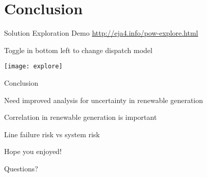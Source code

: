 





\section{Conclusion}
\begin{frame}{Solution Exploration Demo}
\url{http://eja4.info/pow-explore.html}
\bi
\item Toggle in bottom left to change dispatch model
\ei
\begin{center}
\texttt{[image: explore]}
\end{center}
\end{frame}

\begin{frame}{Conclusion}
\bi
\item Need improved analysis for uncertainty in renewable generation
\item Correlation in renewable generation is important
\item Line failure risk vs system risk
\ei

Hope you enjoyed!

Questions?
\EBR
\end{frame}






